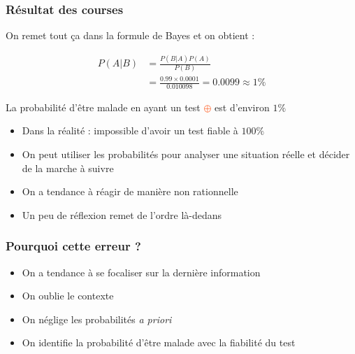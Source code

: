 \documentclass[usenames, dvipsnames, no-framenumber]{beamer}
\newcommand{\positif}{\textcolor{OrangeRed}{$\oplus$} }
\begin{document}
\begin{frame}%
\frametitle{Résultat des courses}

On remet tout ça dans la formule de Bayes et on obtient :

\begin{align*}
P(A|B) &= \frac{P(B|A)P(A)}{P(B)}\\
&= \frac{0.99 \times 0.0001}{0.010098} = 0.0099 \approx 1\%
\end{align*}


\pause
La probabilité d'être malade en ayant un test \positif est d'environ $1\%$

\pause

\begin{itemize}
\item Dans la réalité : impossible d'avoir un test fiable à $100\%$ \pause
\item On peut utiliser les probabilités pour analyser une situation réelle et décider de la marche à suivre \pause
\item On a tendance à réagir de manière non rationnelle\pause
\item Un peu de réflexion remet de l'ordre là-dedans%
\end{itemize}


\end{frame}


\begin{frame}%
\frametitle{Pourquoi cette erreur ?}






\vspace{2cm}

\begin{itemize}
\item<2-> On a tendance à se focaliser sur la dernière information
\item<3-> On oublie le contexte
\item<4-> On néglige les probabilités \textit{a priori}
\item<5-> On identifie la probabilité d'être malade avec la fiabilité du test
\end{itemize}


\end{frame}
\end{document}
